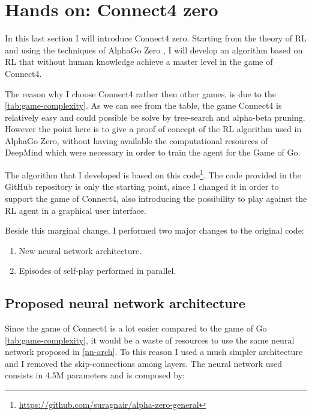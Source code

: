 \documentclass{article}
\begin{document}
\section{Hands on: Connect4 zero}
In this last section I will introduce Connect4 zero. Starting from the theory of RL and using the techniques of AlphaGo Zero \cite{silver2017mastering}, I will develop an algorithm based on RL that without human knowledge achieve a master level in the game of Connect4.

The reason why I choose Connect4 rather then other games, is due to the \autoref{tab:game-complexity}. As we can see from the table, the game Connect4 is relatively easy and could possible be solve by tree-search and alpha-beta pruning. However the point here is to give a proof of concept of the RL algorithm used in AlphaGo Zero, without having available the computational resources of DeepMind which were necessary in order to train the agent for the Game of Go.

The algorithm that I developed is based on this code\footnote{\url{https://github.com/suragnair/alpha-zero-general}}. The code provided in the GitHub repository is only the starting point, since I changed it in order to support the game of Connect4, also introducing the possibility to play against the RL agent in a graphical user interface.

Beside this marginal change, I performed two major changes to the original code:
\begin{enumerate}
\item New neural network architecture.
\item Episodes of self-play performed in parallel.
\end{enumerate}

\subsection{Proposed neural network architecture}
Since the game of Connect4 is a lot easier compared to the game of Go \autoref{tab:game-complexity}, it would be a waste of resources to use the same neural network proposed in \autoref{nn-arch}. To this reason I used a much simpler architecture and I removed the skip-connections among layers. The neural network used consists in 4.5M parameters and is composed by:
\end{document}

